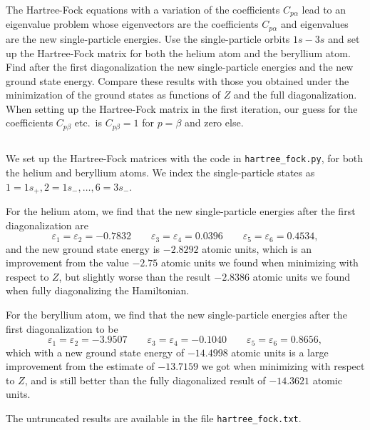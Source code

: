 The Hartree-Fock equations with a variation of the coefficients $C_{p\alpha}$ lead to an eigenvalue problem whose eigenvectors are the coefficients $C_{p\alpha}$ and eigenvalues are the new single-particle energies.
Use the single-particle orbits $1s{-}3s$ and set up the Hartree-Fock matrix for both the helium atom and the beryllium atom.
Find after the first diagonalization the new single-particle energies and the new ground state energy.
Compare these results with those you obtained under the minimization of the ground states as functions of $Z$ and the full diagonalization.
When setting up the Hartree-Fock matrix in the first iteration, our guess for the coefficients $C_{p\beta}$ etc.\ is $C_{p\beta}=1$ for $p=\beta$ and zero else.

\subsection{}
We set up the Hartree-Fock matrices with the code in \verb|hartree_fock.py|, for both the helium and beryllium atoms.
We index the single-particle states as $1 = 1s_+, 2 = 1s_-, \ldots, 6 = 3s_-$.

For the helium atom, we find that the new single-particle energies after the first diagonalization are
\begin{equation*}
    \varepsilon_1 = \varepsilon_2 = -0.7832 \qquad \varepsilon_3 = \varepsilon_4 = 0.0396 \qquad \varepsilon_5 = \varepsilon_6 = 0.4534,
\end{equation*}
and the new ground state energy is $-2.8292$ atomic units, which is an improvement from the value $-2.75$ atomic units we found when minimizing with respect to $Z$, but slightly worse than the result $-2.8386$ atomic units we found when fully diagonalizing the Hamiltonian.

For the beryllium atom, we find that the new single-particle energies after the first diagonalization to be
\begin{equation*}
    \varepsilon_1 = \varepsilon_2 = -3.9507 \qquad \varepsilon_3 = \varepsilon_4 = -0.1040 \qquad \varepsilon_5 = \varepsilon_6 = 0.8656,
\end{equation*}
which with a new ground state energy of $-14.4998$ atomic units is a large improvement from the estimate of $-13.7159$ we got when minimizing with respect to $Z$, and is still better than the fully diagonalized result of $-14.3621$ atomic units.

The untruncated results are available in the file \verb|hartree_fock.txt|.
